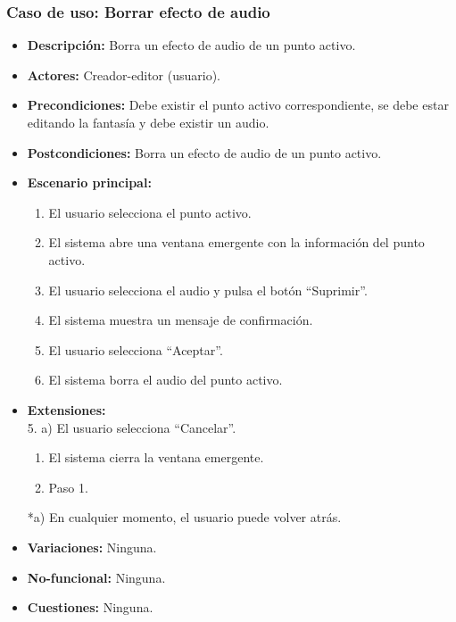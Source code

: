 \subsubsection{Caso de uso: Borrar efecto de audio}
\begin{itemize}
	\item \textbf{Descripción:} Borra un efecto de audio de un punto activo.
	\item \textbf{Actores:} Creador-editor (usuario).
	\item \textbf{Precondiciones:} Debe existir el punto activo correspondiente, se debe estar editando la fantasía y debe existir un audio.
	\item \textbf{Postcondiciones:} Borra un efecto de audio de un punto activo.
	\item \textbf{Escenario principal:}
	\begin{enumerate}
		\item El usuario selecciona el punto activo.
		\item El sistema abre una ventana emergente con la información del punto activo.
		\item El usuario selecciona el audio y pulsa el botón ``Suprimir''.
		\item El sistema muestra un mensaje de confirmación.
		\item El usuario selecciona ``Aceptar''.
		\item El sistema borra el audio del punto activo.
	\end{enumerate}
	\item \textbf{Extensiones:} \\ 5. a) El usuario selecciona ``Cancelar''.
	\begin{enumerate}
		\item El sistema cierra la ventana emergente.
		\item Paso 1.
	\end{enumerate}
	*a) En cualquier momento, el usuario puede volver atrás.
	\item \textbf{Variaciones:} Ninguna.
	\item \textbf{No-funcional:} Ninguna.
	\item \textbf{Cuestiones:} Ninguna.
\end{itemize}


